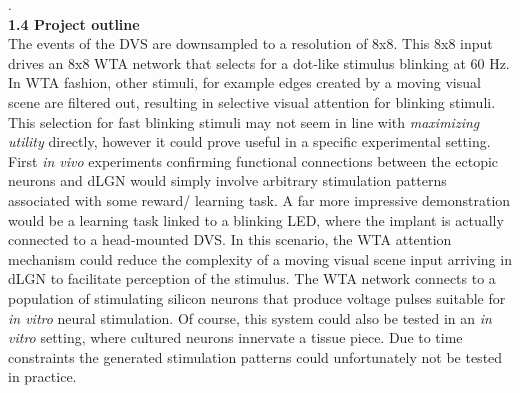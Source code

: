 \documentclass[8pt]{beamer}
\begin{document}
\begin{small}
	\tiny .\\
	\selectfont
	\small
	\textbf{1.4 Project outline} \\ 
	The events of the DVS are downsampled to a resolution of 8x8. This 8x8 input
	drives an 8x8 WTA network that selects for a dot-like stimulus blinking at
	60 Hz. In WTA fashion, other stimuli, for example edges created by a moving
	visual scene are filtered out, resulting in selective visual attention for
	blinking stimuli. This selection for fast blinking stimuli may not seem in
	line with \textit{maximizing utility} directly, however it could prove
	useful in a specific experimental setting. First \textit{in vivo}
	experiments confirming functional connections between the ectopic neurons
	and dLGN would simply involve arbitrary stimulation patterns associated with
	some reward/ learning task. A far more impressive demonstration would be a
	learning task linked to a blinking LED, where the implant is actually
	connected to a head-mounted DVS. In this scenario, the WTA attention
	mechanism could reduce the complexity of a moving visual scene input
	arriving in dLGN to facilitate perception of the stimulus. The WTA network
	connects to a population of stimulating silicon neurons that produce voltage
	pulses suitable for \textit{in vitro} neural stimulation. Of course, this
	system could also be tested in an \textit{in vitro} setting, where cultured
	neurons innervate a tissue piece. Due to time constraints the generated
	stimulation patterns could unfortunately not be tested in practice.
	\pagebreak


\end{small}
\end{document}
